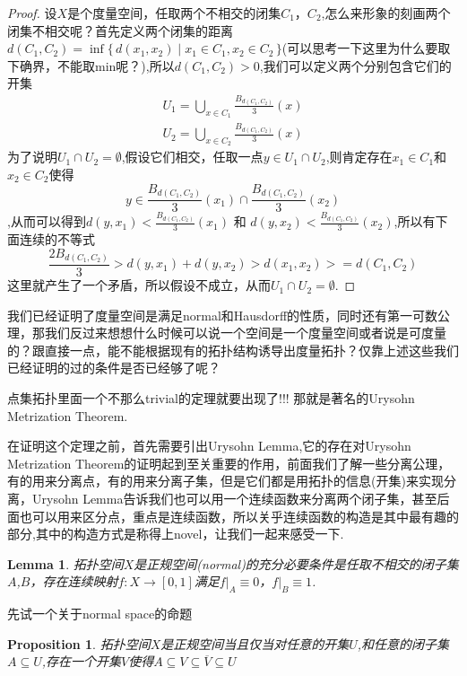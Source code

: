 \documentclass{article}
\newtheorem{lemma}[theorem]{Lemma}
\newtheorem{proposition}[theorem]{Proposition}
\newcommand*{\xfunc}[4]{{#2}\colon{#3}{#1}{#4}}
\newcommand*{\func}[3]{\xfunc{\to}{#1}{#2}{#3}}
\newcommand\Set[2]{\{\,#1\mid#2\,\}} %
\begin{document}
\begin{proof}
设$X$是个度量空间，任取两个不相交的闭集$C_1$，$C_2$,怎么来形象的刻画两个闭集不相交呢？首先定义两个闭集的距离$d(C_1,C_2)=\inf\Set{d(x_1,x_2)}{x_1 \in C_1,x_2 \in C_2}$(可以思考一下这里为什么要取下确界，不能取min呢？),所以$d(C_1,C_2)>0$,我们可以定义两个分别包含它们的开集 
\begin{align} 
U_1 = \bigcup\limits_{x \in C_1}\frac{B_{d(C_1,C_2)}}{3}(x) \\ 
U_2 = \bigcup\limits_{x \in C_2}\frac{B_{d(C_1,C_2)}}{3}(x) 
\end{align}
为了说明$U_1 \cap U_2 = \emptyset$,假设它们相交，任取一点$y \in U_1 \cap U_2 $,则肯定存在$x_1 \in C_1$和$x_2 \in C_2$使得\[y \in \frac{B_{d(C_1,C_2)}}{3}(x_1) \cap \frac{B_{d(C_1,C_2)}}{3}(x_2) \],从而可以得到$d(y,x_1) < \frac{B_{d(C_1,C_2)}}{3}(x_1)$ 和 $d(y,x_2) < \frac{B_{d(C_1,C_2)}}{3}(x_2)$,所以有下面连续的不等式\[\frac{2B_{d(C_1,C_2)}}{3} > d(y,x_1) + d(y,x_2) > d(x_1,x_2) >= d(C_1,C_2)\]这里就产生了一个矛盾，所以假设不成立，从而$U_1 \cap U_2 = \emptyset$.
\end{proof}

我们已经证明了度量空间是满足\rm normal和\rm Hausdorff的性质，同时还有第一可数公理，那我们反过来想想什么时候可以说一个空间是一个度量空间或者说是可度量的？跟直接一点，能不能根据现有的拓扑结构诱导出度量拓扑？仅靠上述这些我们已经证明的过的条件是否已经够了呢？

点集拓扑里面一个不那么trivial的定理就要出现了!!! 那就是著名的Urysohn Metrization Theorem.

在证明这个定理之前，首先需要引出Urysohn Lemma,它的存在对Urysohn Metrization Theorem的证明起到至关重要的作用，前面我们了解一些分离公理，有的用来分离点，有的用来分离子集，但是它们都是用拓扑的信息(开集)来实现分离，Urysohn Lemma告诉我们也可以用一个连续函数来分离两个闭子集，甚至后面也可以用来区分点，重点是连续函数，所以关乎连续函数的构造是其中最有趣的部分,其中的构造方式是称得上novel，让我们一起来感受一下.



\begin{lemma}
拓扑空间$X$是正规空间(normal)的充分必要条件是任取不相交的闭子集$A$,$B$，存在连续映射$\func{f}{X}{[0,1]}$满足$f|_A \equiv 0$，$f|_B \equiv 1$.
\end{lemma}

先试一个关于normal space的命题
\begin{proposition}
拓扑空间$X$是正规空间当且仅当对任意的开集$U$,和任意的闭子集$A \subseteq U$,存在一个开集$V$使得$A \subseteq V \subseteq \overline{V} \subseteq U$
\end{proposition}
\end{document}
